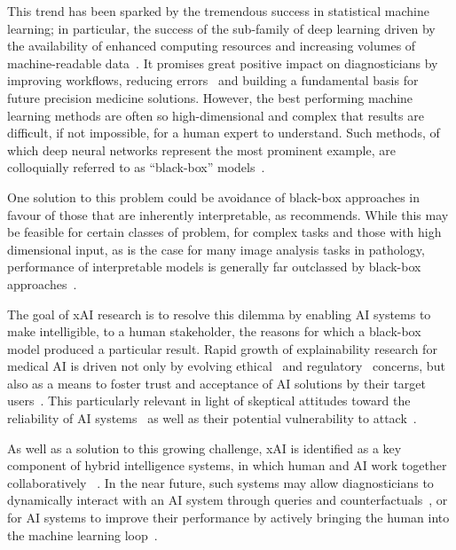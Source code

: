\documentclass[final,5p,times,twocolumn,hyphens]{elsarticle}
\begin{document}
This trend has been sparked by the tremendous success in statistical machine learning; in particular, the success of the sub-family of deep learning driven by the availability of enhanced computing resources and increasing volumes of machine-readable data~\cite{LeCunBengioHinton:2015:DeepLearningNature}. It promises great positive impact on diagnosticians by improving workflows, reducing errors~\cite{Topol:2019:NatureMedicine} and building a fundamental basis for future precision medicine solutions. However, the best performing machine learning methods are often so high-dimensional and complex that results are difficult, if not impossible, for a human expert to understand. Such methods, of which deep neural networks represent the most prominent example, are colloquially referred to as ``black-box'' models~\cite{Castelvecchi:2016:OpenBlack}.

One solution to this problem could be avoidance of black-box approaches in favour of those that are inherently interpretable, as \citet{Rudin:2019:interpretable} recommends. While this may be feasible for certain classes of problem, for complex tasks and those with high dimensional input, as is the case for many image analysis tasks in pathology, performance of interpretable models is generally far outclassed by black-box approaches~\cite{arrieta2020explainable, Holzinger:2020:explainable}.

The goal of xAI research is to resolve this dilemma by enabling AI systems to make intelligible, to a human stakeholder, the reasons for which a black-box model produced a particular result. Rapid growth of explainability research for medical AI is driven not only by evolving ethical~\cite{MuellerEtAl:2021:TenCommandments} and regulatory~\cite{Schneeberger:2020:legalAI} concerns, but also as a means to foster trust and acceptance of AI solutions by their target users~\cite{GuidottiPedreschi:2019:Survey, ProsperiEtAl:2020:CausalHealth, Ferrario:trustmedicalai, gaube:trustmedicalai:2021, kastner2021relation}. This particularly relevant in light of skeptical attitudes toward the reliability of AI systems~\cite{quinn:trustmedicalai:2020, tosun_histomapr_2020} as well as their potential vulnerability to attack~\cite{finlayson2019adversarial, foote2021now}.

As well as a solution to this growing challenge, xAI is identified as a key component of hybrid intelligence systems, in which human and AI work together collaboratively ~\cite{hemmer2021human}. In the near future, such systems may allow diagnosticians to dynamically interact with an AI system through queries and counterfactuals~\cite{HolzingerEtAl:2021:GraphFusion, tosun_histomapr_2020}, or for AI systems to improve their performance by actively bringing the human into the machine learning loop~\cite{Holzinger:2020:explainable}.
\end{document}
